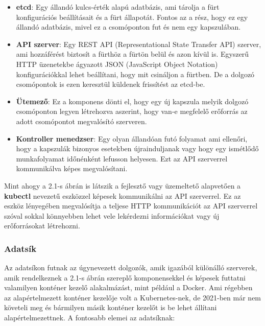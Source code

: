 \begin{itemize}
	\item \textbf{etcd}: Egy állandó kulcs-érték alapú adatbázis, ami tárolja 
	a fürt konfigurációs beállításait és a fürt állapotát. Fontos az a rész, 
	hogy ez egy állandó adatbázis, mivel ez a csomóponton fut és nem egy 
	kapszulában.   
	\item \textbf{API szerver}: Egy REST API (Representational State Transfer API) 
	szerver, ami hozzáférést biztosít a fürthöz a fürtön belül és azon kívül is. 
	Egyszerű HTTP üzenetekbe ágyazott JSON (JavaScript Object Notation) konfigurációkkal
	lehet beállítani, hogy mit csináljon a fürtben. De a dolgozó csomópontok is ezen 
	keresztül küldenek frissítést az etcd-be. 
	\item \textbf{Ütemező}: Ez a komponens dönti el, hogy egy új kapszula melyik
	dolgozó csomóponton legyen létrehozva aszerint, hogy van-e megfelelő erőforrás
	az adott csomópontot megvalósító szerveren.
	\item \textbf{Kontroller menedzser}: Egy olyan állandóan futó folyamat ami ellenőri,
	hogy a kapszulák bizonyos esetekben újrainduljanak vagy hogy egy ismétlődő 
	munkafolyamat időnénként lefusson helyesen. Ezt az API szerverrel kommunikálva
	képes megvalósítani. 
\end{itemize}

Mint ahogy a 2.1-s ábrán is látszik a fejlesztő vagy üzemeltető alapvetően a \textbf{kubectl}
nevezetű eszközzel képesek kommunikálni az API szerverrel. Ez az eszköz lényegében
megvalósítja a teljese HTTP kommunikációt az API szerverrel szóval sokkal könnyebben 
lehet vele lekérdezni információkat vagy új erőforrásokat létrehozni. 

\subsubsection{Adatsík}

Az adatsíkon futnak az úgynevezett dolgozók, amik igazából különálló szerverek,
amik rendelkeznek a 2.1-s ábrán szereplő komponensekkel és képesek futtatni 
valamilyen konténer kezelő alakalmázást, mint például a Docker. Ami régebben az 
alapértelmezett konténer kezelője volt a Kubernetes-nek, de 2021-ben már nem 
követeli meg és bármilyen másik konténer kezelőt is be lehet állítani alapértelmezettnek.
A fontosabb elemei az adatsíknak:

